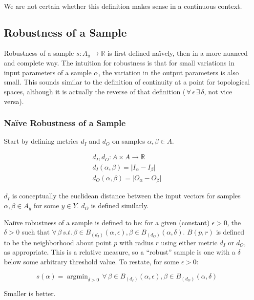 \documentclass{article}
\DeclareMathOperator*{\argmin}{argmin}
\begin{document}
We are not certain whether this definition makes sense in a continuous context.

\subsection{Robustness of a Sample}
Robustness of a sample $s : A_y \to \mathbb{R}$ is first defined na\"ively, then in a more nuanced and complete way. The intuition for robustness is that for small variations in input parameters of a sample $\alpha$, the variation in the output parameters is also small. This sounds similar to the definition of continuity at a point for topological spaces, although it is actually the reverse of that definition ($\,\forall\, \epsilon \,\exists\, \delta$, not vice versa).

\subsubsection{Na\"ive Robustness of a Sample}

Start by defining metrics $d_I$ and $d_O$ on samples $\alpha, \beta \in A$.

\begin{align}
  d_I, d_O : A \times A \to \mathbb{R} \\
  d_I(\alpha, \beta) = \lvert I_\alpha - I_\beta \rvert \\
  d_O(\alpha, \beta) = \lvert O_\alpha - O_\beta \rvert
\end{align}

$d_I$ is conceptually the euclidean distance between the input vectors for samples $\alpha, \beta \in A_y$ for some $y \in Y$. $d_O$ is defined similarly.

Nai\"ive robustness of a sample is defined to be: for a given (constant) $\epsilon > 0$, the $\delta > 0$ such that $\forall\, \beta \,s.t.\, \beta \in B_{(d_I)}(\alpha, \epsilon), \beta \in B_{(d_O)}(\alpha, \delta)$. $B(p, r)$ is defined to be the neighborhood about point $p$ with radius $r$ using either metric $d_I$ or $d_O$, as appropriate. This is a relative measure, so a ``robust'' sample is one with a $\delta$ below some arbitrary threshold value. To restate, for some $\epsilon > 0$:

\begin{equation}
  s(\alpha) = \argmin_{\delta > 0} \,\forall\, \beta \in B_{(d_I)}(\alpha, \epsilon), \beta \in B_{(d_O)}(\alpha, \delta)
\end{equation}

Smaller is better.
\end{document}
